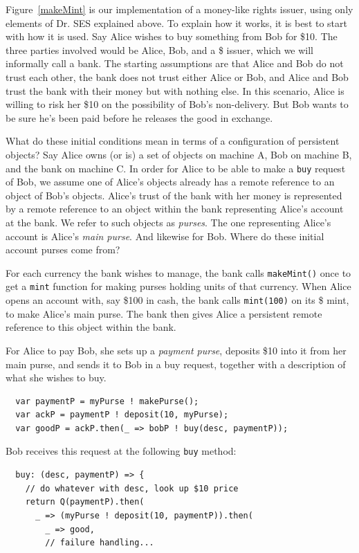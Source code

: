 \documentclass{llncs}
\begin{document}
Figure~\ref{makeMint}  is our implementation of a money-like rights issuer, using only elements of Dr. SES explained above. To explain how it works, it is best to start with how it is used. Say Alice wishes to buy something from Bob for \$10. The three parties involved would be Alice, Bob, and a \$ issuer, which we will informally call a bank. The starting assumptions are that Alice and Bob do not trust each other, the bank does not trust either Alice or Bob, and Alice and Bob trust the bank with their money but with nothing else. In this scenario, Alice is willing to risk her \$10 on the possibility of Bob's non-delivery. But Bob wants to be sure he's been paid before he releases the good in exchange.

What do these initial conditions mean in terms of a configuration of persistent objects? Say Alice owns (or is) a set of objects on machine A, Bob on machine B, and the bank on machine C. In order for Alice to be able to make a {\tt buy} request of Bob, we assume one of Alice's objects already has a remote reference to an object of Bob's objects. Alice's trust of the bank with her money is represented by a remote reference to an object within the bank representing Alice's account at the bank. We refer to such objects as \emph{purses}. The one representing Alice's account is Alice's \emph{main purse}. And likewise for Bob. Where do these initial account purses come from?

For each currency the bank wishes to manage, the bank calls {\tt makeMint()} once to get a {\tt mint} function for making purses holding units of that currency. When Alice opens an account with, say \$100 in cash, the bank calls {\tt mint(100)} on its \$ mint, to make Alice's main purse. The bank then gives Alice a persistent remote reference to this object within the bank.

For Alice to pay Bob, she sets up a \emph{payment purse}, deposits \$10 into it from her main purse, and sends it to Bob in a buy request, together with a description of what she wishes to buy.
\begin{verbatim}
  var paymentP = myPurse ! makePurse();
  var ackP = paymentP ! deposit(10, myPurse);
  var goodP = ackP.then(_ => bobP ! buy(desc, paymentP));
\end{verbatim}

Bob receives this request at the following {\tt buy} method:
\begin{verbatim}
  buy: (desc, paymentP) => {
    // do whatever with desc, look up $10 price
    return Q(paymentP).then(
      _ => (myPurse ! deposit(10, paymentP)).then(
        _ => good,
        // failure handling...
\end{verbatim}
\end{document}
